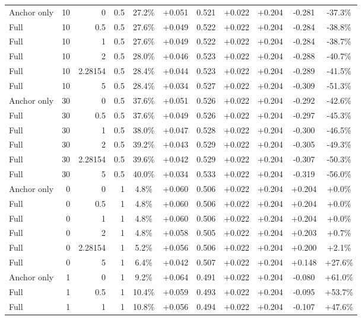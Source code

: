\begin{table}[htbp]
\begin{tabular}{lrrrccccccc}
Anchor only & 10 & 0 & 0.5 & 27.2\% & +0.051 & 0.521 & +0.022 & +0.204 & -0.281 & -37.3\% \\
Full & 10 & 0.5 & 0.5 & 27.6\% & +0.049 & 0.522 & +0.022 & +0.204 & -0.284 & -38.8\% \\
Full & 10 & 1 & 0.5 & 27.6\% & +0.049 & 0.522 & +0.022 & +0.204 & -0.284 & -38.7\% \\
Full & 10 & 2 & 0.5 & 28.0\% & +0.046 & 0.523 & +0.022 & +0.204 & -0.288 & -40.7\% \\
Full & 10 & 2.28154 & 0.5 & 28.4\% & +0.044 & 0.523 & +0.022 & +0.204 & -0.289 & -41.5\% \\
Full & 10 & 5 & 0.5 & 28.4\% & +0.034 & 0.527 & +0.022 & +0.204 & -0.309 & -51.3\% \\
Anchor only & 30 & 0 & 0.5 & 37.6\% & +0.051 & 0.526 & +0.022 & +0.204 & -0.292 & -42.6\% \\
Full & 30 & 0.5 & 0.5 & 37.6\% & +0.049 & 0.526 & +0.022 & +0.204 & -0.297 & -45.3\% \\
Full & 30 & 1 & 0.5 & 38.0\% & +0.047 & 0.528 & +0.022 & +0.204 & -0.300 & -46.5\% \\
Full & 30 & 2 & 0.5 & 39.2\% & +0.043 & 0.529 & +0.022 & +0.204 & -0.305 & -49.3\% \\
Full & 30 & 2.28154 & 0.5 & 39.6\% & +0.042 & 0.529 & +0.022 & +0.204 & -0.307 & -50.3\% \\
Full & 30 & 5 & 0.5 & 40.0\% & +0.034 & 0.533 & +0.022 & +0.204 & -0.319 & -56.0\% \\
Anchor only & 0 & 0 & 1 & 4.8\% & +0.060 & 0.506 & +0.022 & +0.204 & +0.204 & +0.0\% \\
Full & 0 & 0.5 & 1 & 4.8\% & +0.060 & 0.506 & +0.022 & +0.204 & +0.204 & +0.0\% \\
Full & 0 & 1 & 1 & 4.8\% & +0.060 & 0.506 & +0.022 & +0.204 & +0.204 & +0.0\% \\
Full & 0 & 2 & 1 & 4.8\% & +0.058 & 0.505 & +0.022 & +0.204 & +0.203 & +0.7\% \\
Full & 0 & 2.28154 & 1 & 5.2\% & +0.056 & 0.506 & +0.022 & +0.204 & +0.200 & +2.1\% \\
Full & 0 & 5 & 1 & 6.4\% & +0.042 & 0.507 & +0.022 & +0.204 & +0.148 & +27.6\% \\
Anchor only & 1 & 0 & 1 & 9.2\% & +0.064 & 0.491 & +0.022 & +0.204 & -0.080 & +61.0\% \\
Full & 1 & 0.5 & 1 & 10.4\% & +0.059 & 0.493 & +0.022 & +0.204 & -0.095 & +53.7\% \\
Full & 1 & 1 & 1 & 10.8\% & +0.056 & 0.494 & +0.022 & +0.204 & -0.107 & +47.6\% \\

\end{tabular}
\end{table}
